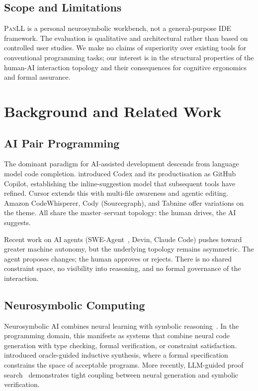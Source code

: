 \documentclass[11pt,a4paper]{article}
\newcommand{\panll}{\textsc{PanLL}}
\begin{document}
\subsection{Scope and Limitations}

\panll{} is a personal neurosymbolic workbench, not a general-purpose
IDE framework. The evaluation is qualitative and architectural rather
than based on controlled user studies. We make no claims of
superiority over existing tools for conventional programming tasks;
our interest is in the structural properties of the human-AI
interaction topology and their consequences for cognitive ergonomics
and formal assurance.

\section{Background and Related Work}\label{sec:background}

\subsection{AI Pair Programming}

The dominant paradigm for AI-assisted development descends from
language model code completion. \citet{chen2021evaluating} introduced
Codex and its productisation as GitHub Copilot, establishing the
inline-suggestion model that subsequent tools have refined. Cursor
extends this with multi-file awareness and agentic editing.
Amazon CodeWhisperer, Cody (Sourcegraph), and Tabnine offer
variations on the theme. All share the master--servant topology:
the human drives, the AI suggests.

Recent work on AI agents (SWE-Agent~\citep{yang2024sweagent},
Devin, Claude Code) pushes toward greater machine autonomy, but
the underlying topology remains asymmetric. The agent proposes
changes; the human approves or rejects. There is no shared
constraint space, no visibility into reasoning, and no formal
governance of the interaction.

\subsection{Neurosymbolic Computing}

Neurosymbolic AI combines neural learning with symbolic
reasoning~\citep{garcez2023neurosymbolic}. In the programming
domain, this manifests as systems that combine neural code
generation with type checking, formal verification, or constraint
satisfaction. \citet{jha2010oracle} introduced oracle-guided
inductive synthesis, where a formal specification constrains the
space of acceptable programs. More recently, LLM-guided proof
search~\citep{first2023baldur} demonstrates tight coupling between
neural generation and symbolic verification.
\end{document}
